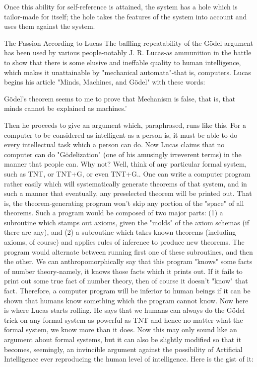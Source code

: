 {Once this ability for self-reference is attained, the system has a hole which is tailor-made
for itself; the hole takes the features of the system into account and uses them against the
system.

                         The Passion According to Lucas
The baffling repeatability of the Gödel argument has been used by various people-notably
J. R. Lucas-as ammunition in the battle to show that there is some elusive and ineffable
quality to human intelligence, which makes it unattainable by "mechanical automata"-that
is, computers. Lucas begins his article "Minds, Machines, and Gödel" with these words:

       Gödel’s theorem seems to me to prove that Mechanism is false, that is, that minds
       cannot be explained as machines.'

         Then he proceeds to give an argument which, paraphrased, runs like this. For a
computer to be considered as intelligent as a person is, it must be able to do every
intellectual task which a person can do. Now Lucas claims that no computer can do
"Gödelization" (one of his amusingly irreverent terms) in the manner that people can.
Why not? Well, think of any particular formal system, such as TNT, or TNT+G, or even
TNT+G.. One can write a computer program rather easily which will systematically
generate theorems of that system, and in such a manner that eventually, any preselected
theorem will be printed out. That is, the theorem-generating program won't skip any
portion of the "space" of all theorems. Such a program would be composed of two major
parts: (1) a subroutine which stamps out axioms, given the "molds" of the axiom schemas
(if there are any), and (2) a subroutine which takes known theorems (including axioms, of
course) and applies rules of inference to produce new theorems. The program would
alternate between running first one of these subroutines, and then the other.
         We can anthropomorphically say that this program "knows" some facts of number
theory-namely, it knows those facts which it prints out. If it fails to print out some true
fact of number theory, then of course it doesn't "know" that fact. Therefore, a computer
program will be inferior to human beings if it can be shown that humans know something
which the program cannot know. Now here is where Lucas starts rolling. He says that we
humans can always do the Gödel trick on any formal system as powerful as TNT-and
hence no matter what the formal system, we know more than it does. Now this may only
sound like an argument about formal systems, but it can also be slightly modified so that
it becomes, seemingly, an invincible argument against the possibility of Artificial
Intelligence ever reproducing the human level of intelligence. Here is the gist of it:

}
